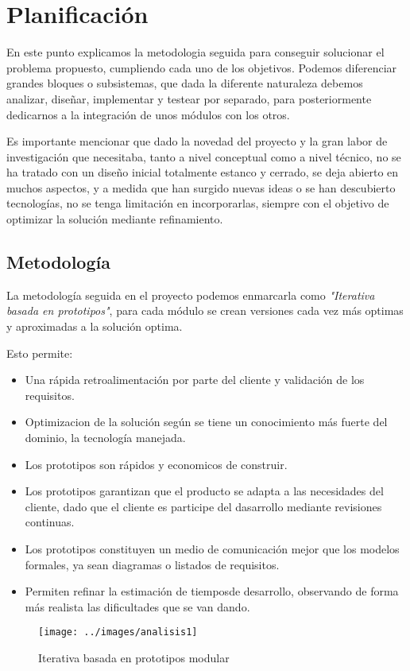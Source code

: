 \chapter{Planificación}

\bigskip
En este punto explicamos la metodologia seguida para conseguir  solucionar el problema propuesto, cumpliendo cada uno de los objetivos. 
Podemos diferenciar grandes bloques o subsistemas, que dada la diferente naturaleza debemos analizar, diseñar, implementar y testear por separado, para posteriormente dedicarnos a la integración de unos módulos con los otros.

\bigskip
Es importante mencionar que dado la novedad del proyecto y la gran labor de investigación que necesitaba, tanto a nivel conceptual como a nivel técnico, no se ha tratado con un diseño inicial totalmente estanco y cerrado, se deja abierto en muchos aspectos, y a medida que han surgido nuevas ideas o se han descubierto tecnologías, no se tenga limitación en incorporarlas, siempre con el objetivo de  optimizar la solución mediante refinamiento.


\section{Metodología}


\bigskip
La metodología seguida en el proyecto podemos enmarcarla como \textit{"Iterativa basada en prototipos"}, para cada módulo se crean versiones 
cada vez más optimas y aproximadas a la solución optima.

Esto permite:

\begin{itemize}
	\item Una rápida retroalimentación por parte del cliente y validación de los requisitos. 
	\item Optimizacion de la solución según se tiene un conocimiento más fuerte del dominio, la tecnología manejada.
	\item Los prototipos son rápidos y economicos de construir.
	\item Los prototipos garantizan que el producto se adapta a las necesidades del cliente, dado que el cliente es participe del dasarrollo mediante revisiones continuas. 
	\item Los prototipos constituyen un medio de comunicación mejor que los modelos formales, ya sean diagramas o listados de requisitos. 
	\item Permiten refinar la estimación de tiemposde desarrollo, observando de forma más realista las dificultades que se van dando.  
	
\end{itemize}

\begin{figure}[h]
	\centering
	\texttt{[image: ../images/analisis1]}
	\caption[Iterativa basada en prototipos modular]{Iterativa basada en prototipos modular}
	\label{fig:}
\end{figure}
\newpage



  

